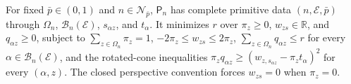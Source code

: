For fixed \(\bar p\in(0,1)\) and \(n\in\mathcal N_{\bar p}\), \(\mathsf P_n\) has complete primitive data \((n,\mathcal E,\bar p)\) through \(\Omega_n\), \(\mathcal B_n(\mathcal E)\), \(s_{\alpha z}\), and \(t_\alpha\). It minimizes \(r\) over \(\pi_z\ge0\), \(w_{zs}\in\mathbb R\), and \(q_{\alpha z}\ge0\), subject to \(\sum_{z\in\Omega_n}\pi_z=1\), \(-2\pi_z\le w_{zs}\le2\pi_z\), \(\sum_{z\in\Omega_n}q_{\alpha z}\le r\) for every \(\alpha\in\mathcal B_n(\mathcal E)\), and the rotated-cone inequalities \(\pi_zq_{\alpha z}\ge(w_{z,s_{\alpha z}}-\pi_zt_\alpha)^2\) for every \((\alpha,z)\). The closed perspective convention forces \(w_{zs}=0\) when \(\pi_z=0\).
